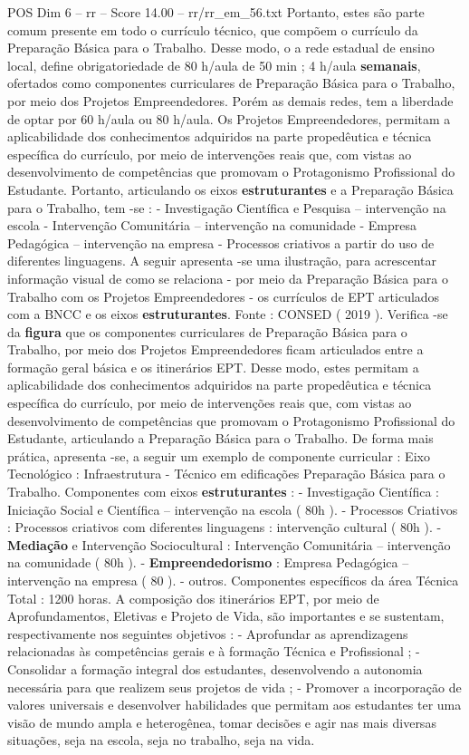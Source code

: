 \begin{textsample}{POS Dim 6 – rr – Score 14.00 – rr/rr\_em\_56.txt}
Portanto, estes são parte comum presente em todo o currículo técnico, que compõem o currículo da Preparação Básica para o Trabalho.
Desse modo, o a rede estadual de ensino local, define obrigatoriedade de 80 h/aula de 50 min ; 4 h/aula \textbf{semanais}, ofertados como componentes curriculares de Preparação Básica para o Trabalho, por meio dos Projetos Empreendedores.
Porém as demais redes, tem a liberdade de optar por 60 h/aula ou 80 h/aula.
Os Projetos Empreendedores, permitam a aplicabilidade dos conhecimentos adquiridos na parte propedêutica e técnica específica do currículo, por meio de intervenções reais que, com vistas ao desenvolvimento de competências que promovam o Protagonismo Profissional do Estudante.
Portanto, articulando os eixos \textbf{estruturantes} e a Preparação Básica para o Trabalho, tem -se : - Investigação Científica e Pesquisa – intervenção na escola - Intervenção Comunitária – intervenção na comunidade - Empresa Pedagógica – intervenção na empresa - Processos criativos a partir do uso de diferentes linguagens.
A seguir apresenta -se uma ilustração, para acrescentar informação visual de como se relaciona - por meio da Preparação Básica para o Trabalho com os Projetos Empreendedores - os currículos de EPT articulados com a BNCC e os eixos \textbf{estruturantes}.
Fonte : CONSED ( 2019 ).
Verifica -se da \textbf{figura} que os componentes curriculares de Preparação Básica para o Trabalho, por meio dos Projetos Empreendedores ficam articulados entre a formação geral básica e os itinerários EPT.
Desse modo, estes permitam a aplicabilidade dos conhecimentos adquiridos na parte propedêutica e técnica específica do currículo, por meio de intervenções reais que, com vistas ao desenvolvimento de competências que promovam o Protagonismo Profissional do Estudante, articulando a Preparação Básica para o Trabalho.
De forma mais prática, apresenta -se, a seguir um exemplo de componente curricular : Eixo Tecnológico : Infraestrutura - Técnico em edificações Preparação Básica para o Trabalho.
Componentes com eixos \textbf{estruturantes} : - Investigação Científica : Iniciação Social e Científica – intervenção na escola ( 80h ). - Processos Criativos : Processos criativos com diferentes linguagens : intervenção cultural ( 80h ). - \textbf{Mediação} e Intervenção Sociocultural : Intervenção Comunitária – intervenção na comunidade ( 80h ). - \textbf{Empreendedorismo} : Empresa Pedagógica – intervenção na empresa ( 80 ). - outros.
Componentes específicos da área Técnica Total : 1200 horas.
A composição dos itinerários EPT, por meio de Aprofundamentos, Eletivas e Projeto de Vida, são importantes e se sustentam, respectivamente nos seguintes objetivos : - Aprofundar as aprendizagens relacionadas às competências gerais e à formação Técnica e Profissional ; - Consolidar a formação integral dos estudantes, desenvolvendo a autonomia necessária para que realizem seus projetos de vida ; - Promover a incorporação de valores universais e desenvolver habilidades que permitam aos estudantes ter uma visão de mundo ampla e heterogênea, tomar decisões e agir nas mais diversas situações, seja na escola, seja no trabalho, seja na vida.

\end{textsample}
